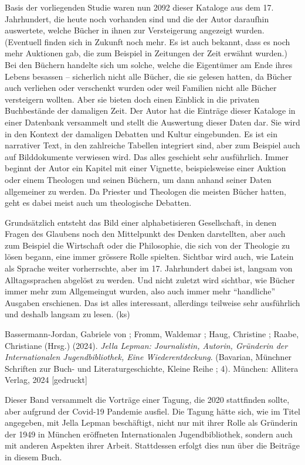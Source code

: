 \documentclass[a4paper,
fontsize=11pt,
oneside,
numbers=noperiodatend,
parskip=half-,
bibliography=totoc,
final
]{scrartcl}
\begin{document}
Basis der vorliegenden Studie waren nun 2092 dieser Kataloge aus dem 17.
Jahrhundert, die heute noch vorhanden sind und die der Autor daraufhin
auswertete, welche Bücher in ihnen zur Versteigerung angezeigt wurden.
(Eventuell finden sich in Zukunft noch mehr. Es ist auch bekannt, dass
es noch mehr Auktionen gab, die zum Beispiel in Zeitungen der Zeit
erwähnt wurden.) Bei den Büchern handelte sich um solche, welche die
Eigentümer am Ende ihres Lebens besassen -- sicherlich nicht alle
Bücher, die sie gelesen hatten, da Bücher auch verliehen oder verschenkt
wurden oder weil Familien nicht alle Bücher versteigern wollten. Aber
sie bieten doch einen Einblick in die privaten Buchbestände der
damaligen Zeit. Der Autor hat die Einträge dieser Kataloge in einer
Datenbank versammelt und stellt die Auswertung dieser Daten dar. Sie
wird in den Kontext der damaligen Debatten und Kultur eingebunden. Es
ist ein narrativer Text, in den zahlreiche Tabellen integriert sind,
aber zum Beispiel auch auf Bilddokumente verwiesen wird. Das alles
geschieht sehr ausführlich. Immer beginnt der Autor ein Kapitel mit
einer Vignette, beispielsweise einer Auktion oder einem Theologen und
seinen Büchern, um dann anhand seiner Daten allgemeiner zu werden. Da
Priester und Theologen die meisten Bücher hatten, geht es dabei meist
auch um theologische Debatten.

Grundsätzlich entsteht das Bild einer alphabetisieren Gesellschaft, in
denen Fragen des Glaubens noch den Mittelpunkt des Denken darstellten,
aber auch zum Beispiel die Wirtschaft oder die Philosophie, die sich von
der Theologie zu lösen begann, eine immer grössere Rolle spielten.
Sichtbar wird auch, wie Latein als Sprache weiter vorherrschte, aber im
17. Jahrhundert dabei ist, langsam von Alltagssprachen abgelöst zu
werden. Und nicht zuletzt wird sichtbar, wie Bücher immer mehr zum
Allgemeingut wurden, also auch immer mehr \enquote{handliche} Ausgaben
erschienen. Das ist alles interessant, allerdings teilweise sehr
ausführlich und deshalb langsam zu lesen. (ks)

Bassermann-Jordan, Gabriele von ; Fromm, Waldemar ; Haug, Christine ;
Raabe, Christiane (Hrsg.) (2024). \emph{Jella Lepman: Journalistin,
Autorin, Gründerin der Internationalen Jugendbibliothek, Eine
Wiederentdeckung}. (Bavarian, Münchner Schriften zur Buch- und
Literaturgeschichte, Kleine Reihe ; 4). München: Allitera Verlag, 2024
{[}gedruckt{]}

Dieser Band versammelt die Vorträge einer Tagung, die 2020 stattfinden
sollte, aber aufgrund der Covid-19 Pandemie ausfiel. Die Tagung hätte
sich, wie im Titel angegeben, mit Jella Lepman beschäftigt, nicht nur
mit ihrer Rolle als Gründerin der 1949 in München eröffneten
Internationalen Jugendbibliothek, sondern auch mit anderen Aspekten
ihrer Arbeit. Stattdessen erfolgt dies nun über die Beiträge in diesem
Buch.
\end{document}
